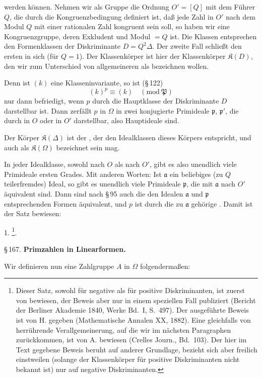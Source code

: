 werden können. Nehmen wir als Gruppe die Ordnung $O' = [Q]$ mit dem Führer $Q$, die durch die Kongruenzbedingung definiert ist, daß jede Zahl in $O'$ nach dem Modul $Q$ mit einer rationalen Zahl kongruent sein soll, so haben wir eine Kongruenzgruppe, deren Exkludent und Modul $= Q$ ist. Die Klassen entsprechen den Formenklassen der Diskriminante $D = Q^2\Delta$. Der zweite Fall schließt den ersten in sich (für $Q = 1$). Der Klassenkörper ist hier der Klassenkörper $\mathfrak{K}(D)$, den wir zum Unterschied von allgemeineren als  bezeichnen wollen.

Denn ist $(k)$ eine Klasseninvariante, so ist (\S\,122)
\[
(k)^p \equiv (k) \quad (\mathrm{mod}\ \mathfrak{P})
\]
nur dann befriedigt, wenn $p$ durch die Hauptklasse der Diskriminante $D$ darstellbar ist. Dann zerfällt $p$ in $\Omega$ in zwei konjugierte Primideale $\mathfrak{p}$, $\mathfrak{p}'$, die durch  in $O$ oder in $O'$ darstellbar, also Hauptideale sind.

Der Körper $\mathfrak{K}(\Delta)$ ist der , der den Idealklassen dieses Körpers entspricht, und auch als  $\mathfrak{K}(\Omega)$ bezeichnet sein mag.

In jeder Idealklasse, sowohl nach $O$ als nach $O'$, gibt es also unendlich viele Primideale ersten Grades. Mit anderen Worten: Ist $\mathfrak{a}$ ein beliebiges (zu $Q$ teilerfremdes) Ideal, so gibt es unendlich viele Primideale $\mathfrak{p}$, die mit $\mathfrak{a}$ nach $O'$ äquivalent sind. Dann sind nach \S\,95 auch die den Idealen $\mathfrak{a}$ und $\mathfrak{p}$ entsprechenden Formen äquivalent, und $p$ ist durch die zu $\mathfrak{a}$ gehörige . Damit ist der Satz bewiesen:

1. \footnote{Dieser Satz, sowohl für negative als für positive Diskriminanten, ist zuerst von  bewiesen, der Beweis aber nur in einem speziellen Fall publiziert (Bericht der Berliner Akademie 1840, Werke Bd.\ I, S.\ 497). Der ausgeführte Beweis ist von H.  gegeben (Mathematische Annalen XX, 1882). Eine gleichfalls von  herrührende Verallgemeinerung, auf die wir im nächsten Paragraphen zurückkommen, ist von A.  bewiesen (Crelles Journ., Bd.\ 103). Der hier im Text gegebene Beweis beruht auf anderer Grundlage, bezieht sich aber freilich einstweilen (solange der Klassenkörper für positive Diskriminanten nicht bekannt ist) nur auf negative Diskriminanten.}.

\begin{center}
\S\,167. \textbf{Primzahlen in Linearformen.}
\end{center}

Wir definieren nun eine Zahlgruppe $A$ in $\Omega$ folgendermaßen:
